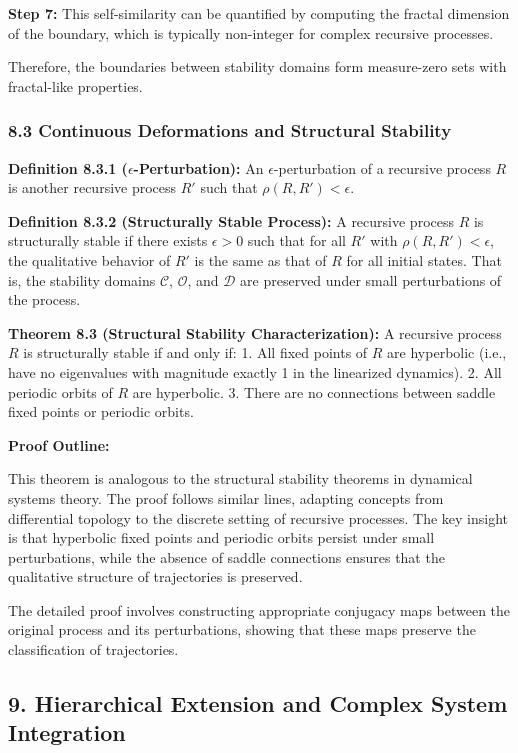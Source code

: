 \documentclass[
]{article}
\begin{document}
\textbf{Step 7:} This self-similarity can be quantified by computing the
fractal dimension of the boundary, which is typically non-integer for
complex recursive processes.

Therefore, the boundaries between stability domains form measure-zero
sets with fractal-like properties.

\subsubsection{8.3 Continuous Deformations and Structural
Stability}\label{continuous-deformations-and-structural-stability}

\textbf{Definition 8.3.1 (\(\epsilon \)-Perturbation):} An
\(\epsilon \)-perturbation of a recursive process \(R\) is another
recursive process \(R'\) such that \(\rho(R, R') < \epsilon\).

\textbf{Definition 8.3.2 (Structurally Stable Process):} A recursive
process \(R\) is structurally stable if there exists \(\epsilon > 0\)
such that for all \(R'\) with \(\rho(R, R') < \epsilon\), the
qualitative behavior of \(R'\) is the same as that of \(R\) for all
initial states. That is, the stability domains \(\mathcal{C}\),
\(\mathcal{O}\), and \(\mathcal{D}\) are preserved under small
perturbations of the process.

\textbf{Theorem 8.3 (Structural Stability Characterization):} A
recursive process \(R\) is structurally stable if and only if: 1. All
fixed points of \(R\) are hyperbolic (i.e., have no eigenvalues with
magnitude exactly 1 in the linearized dynamics). 2. All periodic orbits
of \(R\) are hyperbolic. 3. There are no connections between saddle
fixed points or periodic orbits.

\textbf{Proof Outline:}

This theorem is analogous to the structural stability theorems in
dynamical systems theory. The proof follows similar lines, adapting
concepts from differential topology to the discrete setting of recursive
processes. The key insight is that hyperbolic fixed points and periodic
orbits persist under small perturbations, while the absence of saddle
connections ensures that the qualitative structure of trajectories is
preserved.

The detailed proof involves constructing appropriate conjugacy maps
between the original process and its perturbations, showing that these
maps preserve the classification of trajectories.

\subsection{9. Hierarchical Extension and Complex System
Integration}\label{hierarchical-extension-and-complex-system-integration}
\end{document}
